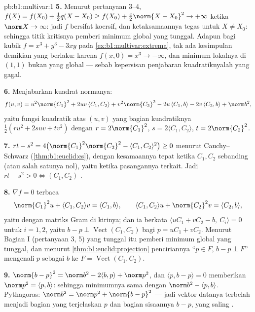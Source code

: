 \begin{solution}{pb:b1:multivar:1}
\textbf{5.} Menurut pertanyaan 3--4, $f(X) = f(X_0) + \frac12 q(X -
X_0) \geq f(X_0) + \frac c2\norm{X - X_0}^2 \to +\infty$ ketika
$\norm X \to \infty$: jadi $f$ bersifat koersif, dan ketaksamaannya
tegas untuk $X \neq X_0$: sehingga titik kritisnya pemberi minimum global
yang tunggal. Adapun bagi kubik $f = x^3 + y^3 - 3xy$ pada
\cref{ex:b1:multivar:extrema}, tak ada kesimpulan demikian yang berlaku: karena $f(x,0)
= x^3 \to -\infty$, dan minimum lokalnya di $(1,1)$ bukan
yang global --- sebab kepersisan penjabaran kuadratiknyalah yang gagal.

\textbf{6.} Menjabarkan kuadrat normanya:
\[
f(u,v) = u^2\norm{C_1}^2 + 2uv\,\langle C_1, C_2\rangle +
v^2\norm{C_2}^2 - 2u\,\langle C_1, b\rangle - 2v\,\langle C_2,
b\rangle + \norm b^2 ,
\]
yaitu fungsi kuadratik atas $(u, v)$ yang bagian kuadratiknya
$\frac12(ru^2 + 2suv + tv^2)$ dengan $r = 2\norm{C_1}^2$, $s =
2\langle C_1, C_2\rangle$, $t = 2\norm{C_2}^2$.

\textbf{7.} $rt - s^2 = 4\bigl(\norm{C_1}^2\norm{C_2}^2 -
\langle C_1, C_2\rangle^2\bigr) \geq 0$ menurut Cauchy--Schwarz
(\cref{thm:b1:euclid:cs}), dengan kesamaannya tepat ketika $C_1, C_2$
sebanding (atau salah satunya nol), yaitu ketika pasangannya
terkait. Jadi $rt - s^2 > 0 \iff (C_1, C_2)$ .

\textbf{8.} $\nabla f = 0$ terbaca
\[
\norm{C_1}^2 u + \langle C_1, C_2\rangle v = \langle C_1,
b\rangle,
\qquad
\langle C_1, C_2\rangle u + \norm{C_2}^2 v = \langle C_2,
b\rangle,
\]
yaitu  dengan matriks Gram di kirinya; dan ia berkata
$\langle uC_1 + vC_2 - b,\ C_i\rangle = 0$ untuk $i = 1, 2$, yaitu
$b - p \perp \operatorname{Vect}(C_1, C_2)$ bagi $p = uC_1 +
vC_2$. Menurut Bagian I (pertanyaan 3, 5)  yang tunggal itu
pemberi minimum global yang tunggal, dan menurut
\cref{thm:b1:euclid:projection} penciriannya ``$p \in
F$, $b - p \perp F$'' mengenali $p$ sebagai  $b$ ke $F = \operatorname{Vect}(C_1, C_2)$.

\textbf{9.} $\norm{b - p}^2 = \norm b^2 - 2\langle b, p\rangle +
\norm p^2$, dan $\langle p, b - p\rangle = 0$ memberikan $\norm p^2 =
\langle p, b\rangle$: sehingga minimumnya sama dengan $\norm b^2 - \langle p,
b\rangle$. Pythagoras: $\norm b^2 = \norm p^2 + \norm{b - p}^2$
--- jadi vektor datanya terbelah menjadi bagian yang terjelaskan $p$ dan
bagian sisaannya $b - p$, yang saling .


\end{solution}
